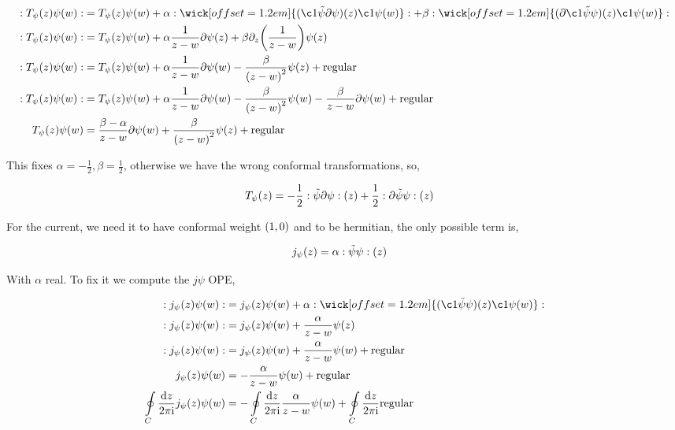\begin{align*}
    \cnord{T_\psi\qty(z)\psi\qty(w)}&=T_\psi\qty(z)\psi\qty(w)+\alpha\cnord{\wick[offset=1.2em]{(\c1{\tilde\psi}\partial\psi)\qty(z)\c1\psi\qty(w)}}+\beta\cnord{\wick[offset=1.2em]{(\partial\c1{\tilde\psi}\psi)\qty(z)\c1\psi\qty(w)}}\\
    \cnord{T_\psi\qty(z)\psi\qty(w)}&=T_\psi\qty(z)\psi\qty(w)+\alpha\frac{1}{z-w}\partial\psi\qty(z)+\beta\partial_z\qty(\frac{1}{z-w})\psi\qty(z)\\
    \cnord{T_\psi\qty(z)\psi\qty(w)}&=T_\psi\qty(z)\psi\qty(w)+\alpha\frac{1}{z-w}\partial\psi\qty(w)-\frac{\beta}{\qty(z-w)^2}\psi\qty(z)+\textnormal{regular}\\
    \cnord{T_\psi\qty(z)\psi\qty(w)}&=T_\psi\qty(z)\psi\qty(w)+\alpha\frac{1}{z-w}\partial\psi\qty(w)-\frac{\beta}{\qty(z-w)^2}\psi\qty(w)-\frac{\beta}{z-w}\partial\psi\qty(w)+\textnormal{regular}\\
    T_\psi\qty(z)\psi\qty(w)&=\frac{\beta-\alpha}{z-w}\partial\psi\qty(w)+\frac{\beta}{\qty(z-w)^2}\psi\qty(z)+\textnormal{regular}
\end{align*}

This fixes $\alpha=-\frac12,\beta=\frac12$, otherwise we have the wrong conformal transformations, so,

\begin{align*}
    T_\psi\qty(z)&=-\frac12:\tilde\psi\partial\psi:\qty(z)+\frac12:\partial\tilde\psi\psi:\qty(z)
\end{align*}

For the current, we need it to have conformal weight $\qty(1,0)$ and to be hermitian, the only possible term is,

\begin{align*}
    j_\psi\qty(z)&=\alpha:\tilde\psi\psi:\qty(z)
\end{align*}
 
With $\alpha$ real. To fix it we compute the $j\psi$ OPE,

\begin{align*}
    \cnord{j_\psi\qty(z)\psi\qty(w)}&=j_\psi\qty(z)\psi\qty(w)+\alpha\cnord{\wick[offset=1.2em]{(\c1{\tilde\psi}\psi)\qty(z)\c1\psi\qty(w)}}\\
    \cnord{j_\psi\qty(z)\psi\qty(w)}&=j_\psi\qty(z)\psi\qty(w)+\frac{\alpha}{z-w}\psi\qty(z)\\
    \cnord{j_\psi\qty(z)\psi\qty(w)}&=j_\psi\qty(z)\psi\qty(w)+\frac{\alpha}{z-w}\psi\qty(w)+\textnormal{regular}\\
    j_\psi\qty(z)\psi\qty(w)&=-\frac{\alpha}{z-w}\psi\qty(w)+\textnormal{regular}\\
    \oint\limits_C\frac{\dd{z}}{2\pi\im}j_\psi\qty(z)\psi\qty(w)&=-\oint\limits_C\frac{\dd{z}}{2\pi\im}\frac{\alpha}{z-w}\psi\qty(w)+\oint\limits_C\frac{\dd{z}}{2\pi\im}\textnormal{regular}
\end{align*}

